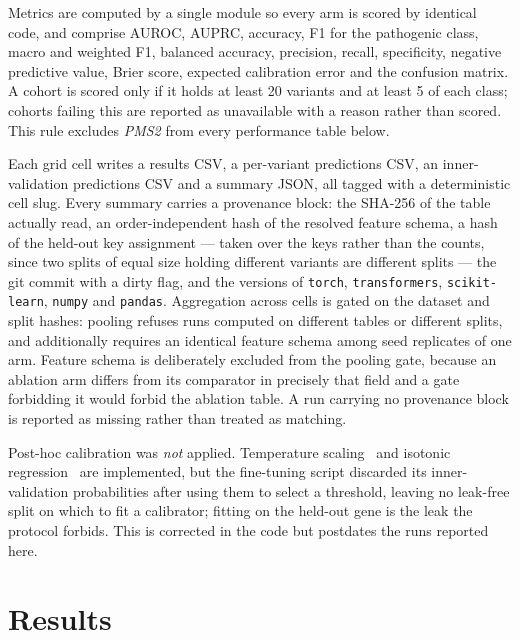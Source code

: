 \documentclass{bioinfo}
\newcommand{\gene}[1]{\textit{#1}}
\begin{document}
Metrics are computed by a single module so every arm is scored by identical
code, and comprise AUROC, AUPRC, accuracy, F1 for the pathogenic class, macro
and weighted F1, balanced accuracy, precision, recall, specificity, negative
predictive value, Brier score, expected calibration error and the confusion
matrix. A cohort is scored only if it holds at least 20 variants and at least 5
of each class; cohorts failing this are reported as unavailable with a reason
rather than scored. This rule excludes \gene{PMS2} from every performance table
below.

Each grid cell writes a results CSV, a per-variant predictions CSV, an
inner-validation predictions CSV and a summary JSON, all tagged with a
deterministic cell slug. Every summary carries a provenance block: the SHA-256
of the table actually read, an order-independent hash of the resolved feature
schema, a hash of the held-out key assignment --- taken over the keys rather
than the counts, since two splits of equal size holding different variants are
different splits --- the git commit with a dirty flag, and the versions of
\texttt{torch}, \texttt{transformers}, \texttt{scikit-learn}, \texttt{numpy}
and \texttt{pandas}. Aggregation across cells is gated on the dataset and split
hashes: pooling refuses runs computed on different tables or different splits,
and additionally requires an identical feature schema among seed replicates of
one arm. Feature schema is deliberately excluded from the pooling gate, because
an ablation arm differs from its comparator in precisely that field and a gate
forbidding it would forbid the ablation table. A run carrying no provenance
block is reported as missing rather than treated as matching.

Post-hoc calibration was \emph{not} applied. Temperature scaling~\cite{guo2017calibration}
and isotonic regression~\cite{zadrozny2002isotonic} are implemented, but the fine-tuning script discarded its
inner-validation probabilities after using them to select a threshold, leaving
no leak-free split on which to fit a calibrator; fitting on the held-out gene is
the leak the protocol forbids. This is corrected in the code but postdates the
runs reported here.

\section{Results}
\end{document}
